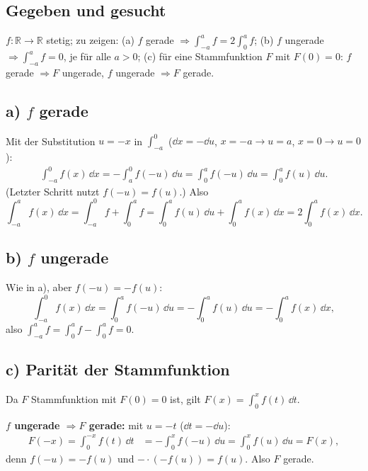 
\subsection*{Gegeben und gesucht}
$f:\mathbb R\to\mathbb R$ stetig; zu zeigen: (a) $f$ gerade
$\Rightarrow\int_{-a}^a f=2\int_0^a f$; (b) $f$ ungerade $\Rightarrow\int_{-a}^a f=0$,
je für alle $a>0$; (c) für eine Stammfunktion $F$ mit $F(0)=0$: $f$ gerade
$\Rightarrow F$ ungerade, $f$ ungerade $\Rightarrow F$ gerade.

\subsection*{a) $f$ gerade}
Mit der Substitution $u=-x$ in $\int_{-a}^{0}$ ($\dd x=-\dd u$, $x=-a\to u=a$,
$x=0\to u=0$):
\begin{align}
  \int_{-a}^{0} f(x)\,\dd x
  = -\int_{a}^{0} f(-u)\,\dd u
  = \int_0^a f(-u)\,\dd u
  = \int_0^a f(u)\,\dd u .
\end{align}
(Letzter Schritt nutzt $f(-u)=f(u)$.) Also
\begin{equation}
  \int_{-a}^{a} f(x)\,\dd x
  = \int_{-a}^{0}f+\int_0^a f
  = \int_0^a f(u)\,\dd u + \int_0^a f(x)\,\dd x
  = 2\int_0^a f(x)\,\dd x .
\end{equation}

\subsection*{b) $f$ ungerade}
Wie in a), aber $f(-u)=-f(u)$:
\begin{equation}
  \int_{-a}^{0}f(x)\,\dd x
  = \int_0^a f(-u)\,\dd u
  = -\int_0^a f(u)\,\dd u
  = -\int_0^a f(x)\,\dd x,
\end{equation}
also $\int_{-a}^a f=\int_0^a f-\int_0^a f=0$.

\subsection*{c) Parität der Stammfunktion}
Da $F$ Stammfunktion mit $F(0)=0$ ist, gilt
$F(x)=\int_0^x f(t)\,\dd t$.

\textbf{$f$ ungerade $\Rightarrow F$ gerade:} mit $u=-t$ ($\dd t=-\dd u$):
\begin{align}
  F(-x)=\int_0^{-x}f(t)\,\dd t
  &= -\int_0^x f(-u)\,\dd u
  = \int_0^x f(u)\,\dd u
   = F(x),
\end{align}
denn $f(-u)=-f(u)$ und $-\cdot(-f(u))=f(u)$. Also $F$ gerade.

